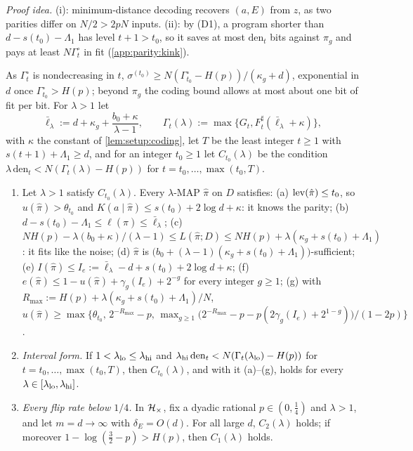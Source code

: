 \emph{Proof idea.} (i): minimum-distance decoding recovers $(a,E)$ from $z$, as two parities differ on $N/2>2pN$ inputs. (ii): by (D1), a program shorter than $d-s(t_0)-\Lambda_1$ has level $t+1>t_0$, so it saves at most $\mathrm{den}_t$ bits against $\pi_g$ and pays at least $N\Gamma^\circ_t$ in fit (\cref{app:parity:kink}).

As $\Gamma^\circ_t$ is nondecreasing in $t$, $\sigma^{(t_0)}\ge N(\Gamma^\circ_{t_0}-H(p))/(\kappa_g+d)$, exponential in $d$ once $\Gamma^\circ_{t_0}>H(p)$; beyond $\pi_g$ the coding bound allows at most about one bit of fit per bit. For $\lambda>1$ let
\[
\bar\ell_\lambda:=d+\kappa_g+\frac{b_0+\kappa}{\lambda-1},\qquad\Gamma_t(\lambda):=\max\{G_t,F^\sharp_t(\bar\ell_\lambda+\kappa)\},
\]
with $\kappa$ the constant of \cref{lem:setup:coding}, let $T$ be the least integer $t\ge1$ with $s(t+1)+\Lambda_1\ge d$, and for an integer $t_0\ge1$ let $C_{t_0}(\lambda)$ be the condition $\lambda\,\mathrm{den}_t<N(\Gamma_t(\lambda)-H(p))$ for $t=t_0,\dots,\max(t_0,T)$.

\begin{proposition}\label{prop:parity:range}
\begin{enumerate}[label=(\roman*),itemsep=0pt,topsep=2pt,leftmargin=*]
\item Let $\lambda>1$ satisfy $C_{t_0}(\lambda)$. Every $\lambda$-MAP $\hat\pi$ on $D$ satisfies:
(a) $\operatorname{lev}(\hat\pi)\le t_0$, so $u(\hat\pi)>\theta_{t_0}$ and $K(a\mid\hat\pi)\le s(t_0)+2\log d+\kappa$: it knows the parity;
(b) $d-s(t_0)-\Lambda_1\le\ell(\hat\pi)\le\bar\ell_\lambda$;
(c) $NH(p)-\lambda(b_0+\kappa)/(\lambda-1)\le L(\hat\pi;D)\le NH(p)+\lambda(\kappa_g+s(t_0)+\Lambda_1)$: it fits like the noise;
(d) $\hat\pi$ is $\big(b_0+(\lambda-1)(\kappa_g+s(t_0)+\Lambda_1)\big)$-sufficient;
(e) $I(\hat\pi)\le I_e:=\bar\ell_\lambda-d+s(t_0)+2\log d+\kappa$;
(f) $e(\hat\pi)\le1-u(\hat\pi)+\gamma_g(I_e)+2^{-g}$ for every integer $g\ge1$;
(g) with $R_{\max}:=H(p)+\lambda(\kappa_g+s(t_0)+\Lambda_1)/N$, $u(\hat\pi)\ge\max\big\{\theta_{t_0},\,2^{-R_{\max}}-p,\,\max_{g\ge1}\big(2^{-R_{\max}}-p-p(2\gamma_g(I_e)+2^{1-g})\big)/(1-2p)\big\}$.
\item \emph{Interval form.} If $1<\lambda_{\rm lo}\le\lambda_{\rm hi}$ and $\lambda_{\rm hi}\,\mathrm{den}_t<N(\Gamma_t(\lambda_{\rm lo})-H(p))$ for $t=t_0,\dots,\max(t_0,T)$, then $C_{t_0}(\lambda)$, and with it (a)--(g), holds for every $\lambda\in[\lambda_{\rm lo},\lambda_{\rm hi}]$.
\item \emph{Every flip rate below $1/4$.} In $\mathcal{H}_{\times}$, fix a dyadic rational $p\in(0,\frac14)$ and $\lambda>1$, and let $m=d\to\infty$ with $\delta_E=O(d)$. For all large $d$, $C_2(\lambda)$ holds; if moreover $1-\log(\frac32-p)>H(p)$, then $C_1(\lambda)$ holds.
\end{enumerate}
\end{proposition}


